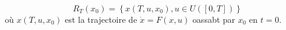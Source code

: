 \[R_T(x_0)=\left\{x(T,u,x_0), u\in U([0,T])\right\}\]
où $x(T,u,x_0)$ est la trajectoire de $\dot{x}=F(x,u)$ oassabt par $x_0$ en $t=0$. 


